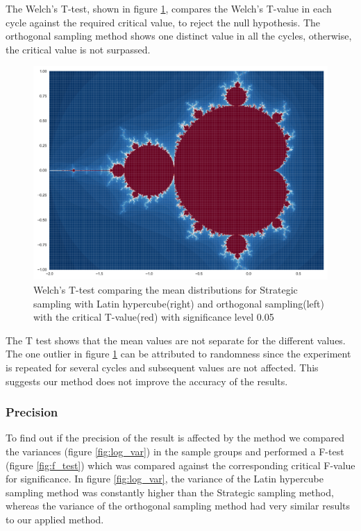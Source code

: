 \documentclass{uva-inf-article}
\begin{document}
The Welch's T-test, shown in figure \ref{fig:welch_t}, compares the Welch's T-value in each cycle against the required critical value, to reject the null hypothesis. The orthogonal sampling method shows one distinct value in all the cycles, otherwise, the critical value is not surpassed.\\
\begin{figure}[h!]
  \centering
  \includegraphics[width=.85\textwidth]{fractal.pdf}
  \caption{Welch's T-test comparing the mean distributions for Strategic sampling with Latin hypercube(right) and orthogonal sampling(left) with the critical T-value(red) with significance level 0.05}
  \label{fig:welch_t}
\end{figure}

The T test shows that the mean values are not separate for the different values. The one outlier in figure \ref{fig:welch_t} can be attributed to randomness since the experiment is repeated for several cycles and subsequent values are not affected. This suggests our method does not improve the accuracy of the results.


\subsubsection{Precision}

To find out if the precision of the result is affected by the method we compared the variances  (figure \ref{fig:log_var}) in the sample groups and performed a F-test (figure \ref{fig:f_test}) which was compared against the corresponding critical F-value for significance.
In figure \ref{fig:log_var}, the variance of the Latin hypercube sampling method was constantly higher than the Strategic sampling method, whereas the variance of the orthogonal sampling method had very similar results to our applied method.\\
\end{document}

